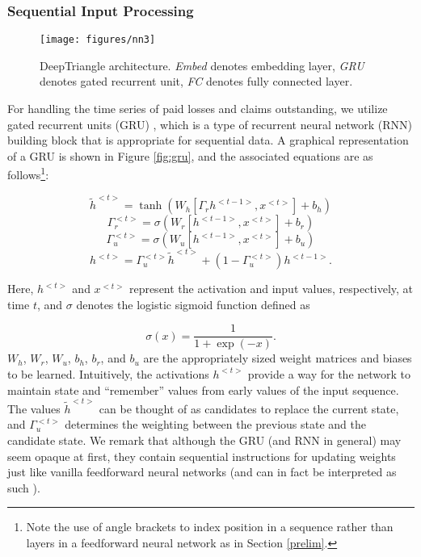 \documentclass[risks,article,submit,moreauthors,pdftex]{mdpi}
\begin{document}
\hypertarget{sequential-input-processing}{%
\subsubsection{Sequential Input Processing}\label{sequential-input-processing}}

\begin{figure}

{\centering \texttt{[image: figures/nn3]} 

}

\caption{DeepTriangle architecture. \textit{Embed} denotes embedding layer, \textit{GRU} denotes gated recurrent unit, \textit{FC} denotes fully connected layer.}\label{fig:dt}
\end{figure}

For handling the time series of paid losses and claims outstanding, we utilize gated recurrent units (GRU) \citep{chung2014empirical}, which is a type of recurrent neural network (RNN) building block that is appropriate for sequential data. A graphical representation of a GRU is shown in Figure \ref{fig:gru}, and the associated equations are as follows\footnote{Note the use of angle brackets to index position in a sequence rather than layers in a feedforward neural network as in Section \ref{prelim}.}:

\begin{equation}
\tilde{h}^{<t>} = \tanh(W_h[\Gamma_r h^{<t-1>}, x^{<t>}] + b_h)
\end{equation}
\begin{equation}
\Gamma_r^{<t>} = \sigma(W_r[h^{<t-1>}, x^{<t>}] + b_r)
\end{equation}
\begin{equation}
\Gamma_u^{<t>} = \sigma(W_u[h^{<t-1>},x^{<t>}] + b_u)
\end{equation}
\begin{equation}
h^{<t>} = \Gamma_u^{<t>} \tilde{h}^{<t>} + (1 - \Gamma_u^{<t>})h^{<t-1>}.
\end{equation}

Here, \(h^{<t>}\) and \(x^{<t>}\) represent the activation and input values, respectively, at time \(t\), and \(\sigma\) denotes the logistic sigmoid function defined as

\begin{equation}
\sigma(x) = \frac{1}{1 + \exp(-x)}\label{eq:eq1}.
\end{equation}
\(W_h\), \(W_r\), \(W_u\), \(b_h\), \(b_r\), and \(b_u\) are the appropriately sized weight matrices and biases to be learned. Intuitively, the activations \(h^{<t>}\) provide a way for the network to maintain state and ``remember'' values from early values of the input sequence. The values \(\tilde{h}^{<t>}\) can be thought of as candidates to replace the current state, and \(\Gamma_u^{<t>}\) determines the weighting between the previous state and the candidate state. We remark that although the GRU (and RNN in general) may seem opaque at first, they contain sequential instructions for updating weights just like vanilla feedforward neural networks (and can in fact be interpreted as such \citep{goodfellow2016deep}).
\end{document}
